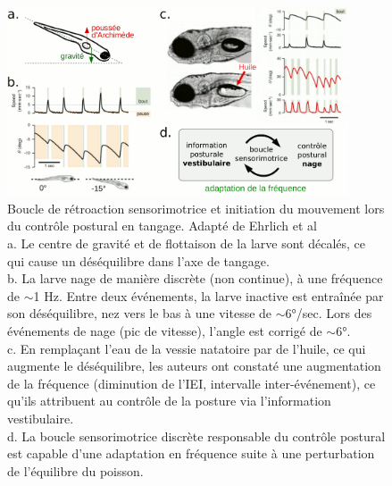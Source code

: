 \begin{figure}
    \centering
    \includegraphics[width=0.9\textwidth]{./files/schoppik_movement-initiation.svg.png}
    \caption{Boucle de rétroaction sensorimotrice et initiation du mouvement lors du contrôle postural en tangage. Adapté de Ehrlich et al \cite{ehrlich_control_2017}
    \\ a. Le centre de gravité et de flottaison de la larve sont décalés, ce qui cause un déséquilibre dans l'axe de tangage.
    \\ b. La larve nage de manière discrète (non continue), à une fréquence de $\sim$1 Hz. Entre deux événements, la larve inactive est entraînée par son déséquilibre, nez vers le bas à une vitesse de $\sim$6°/sec. Lors des événements de nage (pic de vitesse), l'angle est corrigé de $\sim$6°.
    \\ c. En remplaçant l'eau de la vessie natatoire par de l'huile, ce qui augmente le déséquilibre, les auteurs ont constaté une augmentation de la fréquence (diminution de l'IEI, intervalle inter-événement), ce qu'ils attribuent au contrôle de la posture via l'information vestibulaire.
    \\ d. La boucle sensorimotrice discrète responsable du contrôle postural est capable d'une adaptation en fréquence suite à une perturbation de l'équilibre du poisson.
    \label{FIGmovementinitiation}}
    \end{figure}

